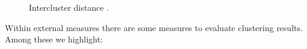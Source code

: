 \begin{figure}[htbp]
  \centering
    \caption{Intercluster distance \citep{b60}.}%
    \label{fig:separation}%
\end{figure}
Within external measures there are some measures to evaluate clustering results. Among these we highlight:
